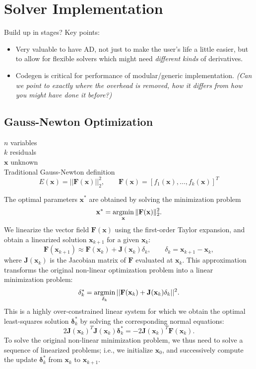 \section{Solver Implementation}
\label{sub:solver}

Build up in stages?
Key points:

\begin{itemize}
  \item Very valuable to have AD, not just to make the user's life a little easier, but to allow for flexible solvers which might need \emph{different kinds} of derivatives.
  \item Codegen is critical for performance of modular/generic implementation. \emph{(Can we point to exactly where the overhead is removed, how it differs from how you might have done it before?)}
\end{itemize}

\subsection{Gauss-Newton Optimization} %
\label{sec:jtj}
$n$ variables\\
$k$ residuals\\
$\mathbf{x}$ unknown\\
Traditional Gauss-Newton definition
$$E (\mathbf{x}) = || \mathbf{F}(\mathbf{x}) ||_2^2,\qquad \mathbf{F}(\mathbf{x})  =[f_1(\mathbf{x}), \hdots, f_k(\mathbf{x})]^T$$



The optimal parameters $\mathbf{x}^{*}$ are obtained by solving the minimization problem
$$ \mathbf{x}^{*} = \displaystyle \operatorname*{argmin}_\mathbf{x} \Vert \mathbf{F} (\mathbf{x}) \Vert_2^2.$$
%
We linearize the vector field $\mathbf{F}(\mathbf{x})$ using the first-order Taylor expansion,
and obtain a linearized solution $\mathbf{x}_{k+1}$ for a given $\mathbf{x}_k$:
$$ \mathbf{F}(\mathbf{x}_{k+1}) \approx \mathbf{F}(\mathbf{x}_{k})+\mathbf{J}(\mathbf{x}_{k})\delta_k,\qquad \delta_k = \mathbf{x}_{k+1}-\mathbf{x}_{k},$$
where $\mathbf{J}(\mathbf{x}_k)$ is the Jacobian matrix of $\mathbf{F}$ evaluated at $\mathbf{x}_k$.
This approximation transforms the original non-linear optimization problem into a linear minimization problem:
$$
\mathbf{\delta}_{k}^{*}=\operatorname*{argmin}_{\mathbf{\delta}_{k}}{||\mathbf{F}(\mathbf{x}_{k})+\mathbf{J}(\mathbf{x}_{k})\mathbf{\delta}_{k}||^2}.
$$
This is a highly over-constrained linear system for which we obtain the optimal least-squares solution $\mathbf{\delta}_k^{*}$ by solving the corresponding normal equations:
$$
2 \mathbf{J}(\mathbf{x}_{k})^T\mathbf{J}(\mathbf{x}_{k})\mathbf{\delta}_{k}^{*} = - 2\mathbf{J}(\mathbf{x}_{k})^T\mathbf{F}(\mathbf{x}_{k}).
$$
To solve the original non-linear minimization problem, we thus need to solve a sequence of linearized problems;
i.e., we initialize $\mathbf{x}_0$, and successively compute the update $\mathbf{\delta}_k^{*}$ from $\mathbf{x}_k$ to $\mathbf{x}_{k+1}$.

